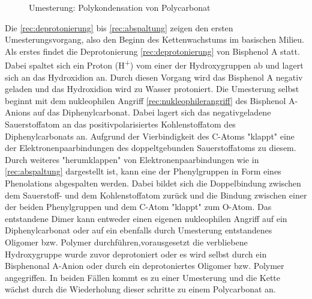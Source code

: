 \begin{figure}[h]
    \begin{center}
        \footnotesize
        \setatomsep{1.7em}


        \vspace{10pt}

        \chemrel{->}

        \caption{Umesterung: Polykondensation von Polycarbonat}
        \label{rec:polycarbonat}
    \end{center}
\end{figure}

Die \autoref{rec:deprotonierung} bis \autoref{rec:abspaltung} zeigen den ersten
Umesterungsvorgang, also den Beginn des Kettenwachstums im basischen Milieu. Als
erstes findet die Deprotonierung \autoref{rec:deprotonierung} von Bisphenol A
statt. Dabei spaltet sich ein Proton (H\textsuperscript{+}) vom einer der
Hydroxygruppen ab und lagert sich an das Hydroxidion an. Durch diesen Vorgang
wird das Bisphenol A negativ geladen und das Hydroxidion wird zu Wasser
protoniert. Die Umesterung selbst beginnt mit dem nukleophilen Angriff
\autoref{rec:nukleophilerangriff} des Bisphenol A-Anions auf das
Diphenylcarbonat. Dabei lagert sich das negativgeladene Sauerstoffatom an das
positivpolarisiertes Kohlenstoffatom des Diphenylcarbonats an. Aufgrund der
Vierbindigkeit des C-Atoms "klappt" eine der
Elektronenpaarbindungen des doppeltgebunden Sauerstoffatoms zu diesem. Durch
weiteres "herumklappen" von
Elektronenpaarbindungen wie in \autoref{rec:abspaltung} dargestellt ist, kann
eine der Phenylgruppen in Form eines Phenolations abgespalten werden. Dabei
bildet sich die Doppelbindung zwischen dem Sauerstoff- und dem Kohlenstoffatom
zurück und die Bindung zwischen einer der beiden Phenylgruppen und dem C-Atom
"klappt" zum O-Atom. Das entstandene Dimer kann
entweder einen eigenen nukleophilen Angriff auf ein Diphenylcarbonat oder auf
ein ebenfalls durch Umesterung entstandenes Oligomer bzw. Polymer
durchführen,vorausgesetzt die verbliebene Hydroxygruppe wurde zuvor deprotoniert
oder es wird selbst durch ein Bisphenonal A-Anion oder durch ein deprotoniertes
Oligomer bzw. Polymer angegriffen. In beiden Fällen kommt es zu einer Umesterung
und die Kette wächst durch die Wiederholung dieser schritte zu einem
Polycarbonat an.

